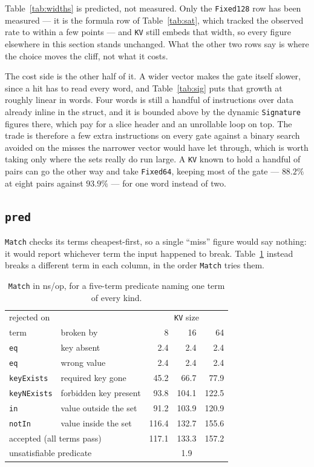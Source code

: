 \documentclass[11pt]{article}
\newcommand{\code}[1]{\texttt{#1}}
\begin{document}
Table~\ref{tab:widths} is predicted, not measured. Only the \code{Fixed128} row has been
measured --- it is the formula row of Table~\ref{tab:sat}, which tracked the
observed rate to within a few points --- and \code{KV} still embeds that width,
so every figure elsewhere in this section stands unchanged. What the other two
rows say is where the choice moves the cliff, not what it costs.

The cost side is the other half of it. A wider vector makes the gate itself
slower, since a hit has to read every word, and Table~\ref{tab:sig} puts that
growth at roughly linear in words. Four words is still a handful of
instructions over data already inline in the struct, and it is bounded above by
the dynamic \code{Signature} figures there, which pay for a slice header and an
unrollable loop on top. The trade is therefore a few extra instructions on
every gate against a binary search avoided on the misses the narrower vector
would have let through, which is worth taking only where the sets really do run
large. A \code{KV} known to hold a handful of pairs can go the other way and
take \code{Fixed64}, keeping most of the gate --- $88.2\%$ at eight pairs
against $93.9\%$ --- for one word instead of two.

\subsection{\code{pred}}

\code{Match} checks its terms cheapest-first, so a single ``miss'' figure would
say nothing: it would report whichever term the input happened to break.
Table~\ref{tab:match} instead breaks a different term in each column, in the
order \code{Match} tries them.

\begin{table}[h]
\centering
\begin{tabular}{llrrr}
\hline
\multicolumn{2}{l}{rejected on} & \multicolumn{3}{c}{\code{KV} size} \\
term & broken by & 8 & 16 & 64 \\
\hline
\code{eq}         & key absent        &   2.4 &   2.4 &   2.4 \\
\code{eq}         & wrong value       &   2.4 &   2.4 &   2.4 \\
\code{keyExists}  & required key gone  &  45.2 &  66.7 &  77.9 \\
\code{keyNExists} & forbidden key present &  93.8 & 104.1 & 122.5 \\
\code{in}         & value outside the set &  91.2 & 103.9 & 120.9 \\
\code{notIn}      & value inside the set & 116.4 & 132.7 & 155.6 \\
\hline
\multicolumn{2}{l}{accepted (all terms pass)} & 117.1 & 133.3 & 157.2 \\
\multicolumn{2}{l}{unsatisfiable predicate}   & \multicolumn{3}{c}{1.9} \\
\hline
\end{tabular}
\caption{\code{Match} in ns/op, for a five-term predicate naming one term of
every kind.}
\label{tab:match}
\end{table}
\end{document}

